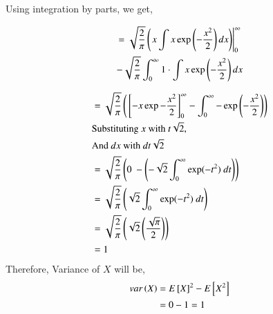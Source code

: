 \documentclass[journal,12pt,twocolumn]{IEEEtran}
\renewcommand\thesection{\arabic{section}}
\begin{document}
\begin{enumerate}[label=\thesection.\arabic*
,ref=\thesection.\theenumi]
Using integration by parts, we get,

\begin{multline}
= \sqrt{\frac{2}{\pi}} \left(\left. x \int x \exp\left(-\frac{x^2}{2}\right) dx\right)\right|_0^{\infty} \\- \sqrt{\frac{2}{\pi}}  \int_{0}^{\infty} 1 \cdot \int x \exp\left(-\frac{x^2}{2}\right) dx\\
\end{multline}

\begin{align*}
& = \sqrt{\frac{2}{\pi}}\brak{\sbrak{-x\exp{-\frac{x^2}{2}}}_0^{\infty} - \int_0^{\infty}- \exp{\brak{-\frac{x^2}{2}}}}\\
& \text{Substituting } x \text{ with } t\sqrt{2},\\
& \text{And } dx \text{ with } dt\sqrt{2}\\
& = \sqrt{\frac{2}{\pi}}\brak{0 \  - \brak{-{\sqrt{2}} \int_0^{\infty} \exp(-t^2) \ dt}}\\
& = \sqrt{\frac{2}{\pi}}\brak{\sqrt{2} \int_0^{\infty} \exp(-t^2) \ dt}\\
& = \sqrt{\frac{2}{\pi}}\brak{\sqrt{2}\brak{\frac{\sqrt{\pi}}{2}}}\\
& = 1
\end{align*}
Therefore, Variance of $X$ will be,
\begin{align*}
var\left(X\right) & = {E{}\left[X\right]}^2 - E{}\left[X^2\right]\\
& = 0-1 = 1\\
\end{align*}
\end{enumerate}

\newpage
\end{document}
